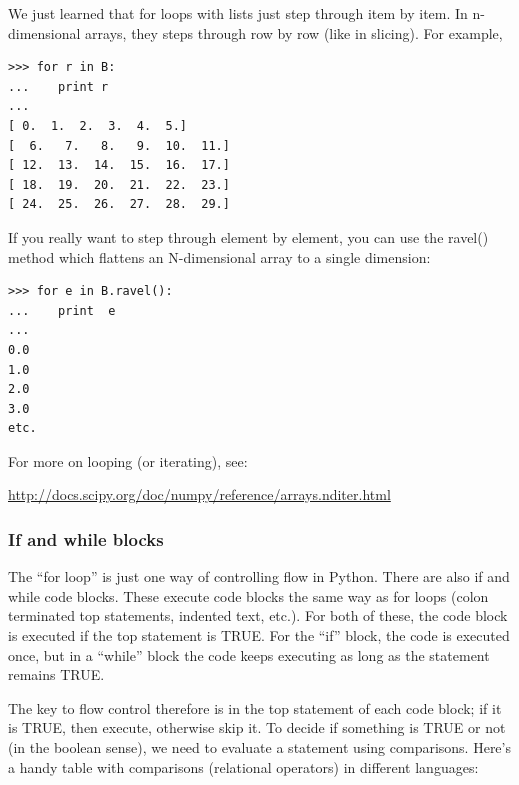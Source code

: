 \documentclass[11pt]{book}
\begin{document}
{{{{We just learned that  {\color{blue} for} loops with lists  just step through item by item.  In n-dimensional arrays, they steps through row by row (like in slicing).  For example,


{ \color{blue} \begin{verbatim}
>>> for r in B:
...    print r
...
[ 0.  1.  2.  3.  4.  5.]
[  6.   7.   8.   9.  10.  11.]
[ 12.  13.  14.  15.  16.  17.]
[ 18.  19.  20.  21.  22.  23.]
[ 24.  25.  26.  27.  28.  29.]
\end{verbatim}}

If you really want to step through element by element, you can use the {\color{blue}ravel()} method which flattens an N-dimensional array to a single dimension:

{ \color{blue} \begin{verbatim}
>>> for e in B.ravel():
...    print  e
...
0.0
1.0
2.0
3.0
etc.
\end{verbatim}}

For more on looping (or iterating), see:

\url{http://docs.scipy.org/doc/numpy/reference/arrays.nditer.html}

\subsubsection{If and while blocks}

The ``for loop'' is just one way of controlling flow in Python.  There are also {\color{blue}if}  and  {\color{blue}while} code blocks.  These execute code blocks  the same way as for loops (colon terminated top statements, indented text, etc.).  For both of these, the code block is executed if the top statement is  TRUE.  For the ``if'' block, the code is executed once, but in a ``while'' block the code keeps executing as long as the statement remains TRUE.

The key to flow control therefore is in the top statement of each code block;  if it is TRUE, then execute, otherwise skip it.  To decide if something is TRUE or not (in the boolean sense), we need to evaluate a statement using comparisons.   Here's a handy table with comparisons (relational operators) in different languages:

}}}}
\end{document}
